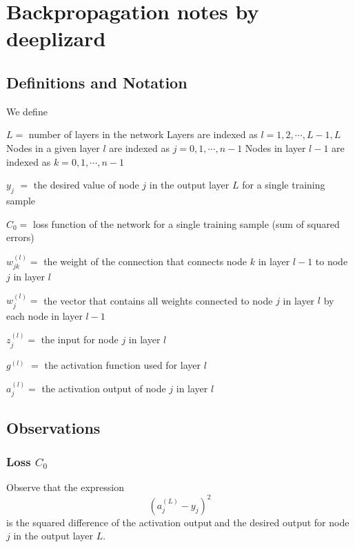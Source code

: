 \documentclass{article}
\begin{document}
\section{\protect\vspace{1pt}Backpropagation notes by deeplizard}

\subsection{\protect\vspace{1pt}Definitions and Notation}

We define

$L=$ number of layers in the network\newline
Layers are indexed as $l=1,2,\cdots ,L-1,L$\newline
Nodes in a given layer $l$ are indexed as $j=0,1,\cdots ,n-1$\newline
Nodes in layer $l-1$ are indexed as $k=0,1,\cdots ,n-1$\newline

$y_{j}$ $=$ the desired value of node $j$ in the output layer $L$ for a
single training sample

$C_{0}=$ loss function of the network for a single training sample (sum of
squared errors)

$w_{jk}^{(l)}=$ the weight of the connection that connects node $k$ in layer 
$l-1$ to node $j$ in layer $l$

$w_{j}^{\left( l\right) }=$ the vector that contains all weights connected
to node $j$ in layer $l$ by each node in layer $l-1$

$z_{j}^{(l)}=$ the input for node $j$ in layer $l$

$g^{\left( l\right) }$ $=$ the activation function used for layer $l$

$a_{j}^{(l)}=$ the activation output of node $j$ in layer $l$\vspace{1pt}

\subsection{Observations}

\subsubsection{Loss $C_{0}$}

Observe that the expression 
\[
\left( a_{j}^{(L)}-y_{j}\right) ^{2} 
\]%
is the squared difference of the activation output$\ $and the desired output
for node $j$ in the output layer $L$.
\end{document}
